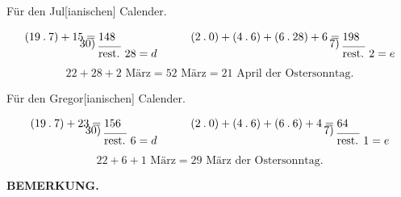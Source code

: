 \begin{center}Für den Jul[ianischen] Calender.\end{center}
\[
\begin{array}{r@{\;}l}
(19\mathbin{.}7)+15=&148\\[-6pt]30)&\rule{2em}{.35pt}\\[-3pt]&\text{rest. }28=d
\end{array}
\qquad
\begin{array}{r@{\;}l}
(2\mathbin{.}0)+(4\mathbin{.}6)+(6\mathbin{.}28)+6=&198\\[-6pt]7)&\rule{2em}{.35pt}\\[-3pt]&\text{rest. }2=e
\end{array}
\]
\[
22+28+2\text{ März}=52\text{ März}=21\text{ April der Ostersonntag.}
\]
\clearpage{}
\begin{center}Für den Gregor[ianischen] Calender.\end{center}
\[
\begin{array}{r@{\;}l}
(19\mathbin{.}7)+23=&156\\[-6pt]30)&\rule{2em}{.35pt}\\[-3pt]&\text{rest. }6=d
\end{array}
\qquad
\begin{array}{r@{\;}l}
(2\mathbin{.}0)+(4\mathbin{.}6)+(6\mathbin{.}6)+4=&64\\[-6pt]7)&\rule{2em}{.35pt}\\[-3pt]&\text{rest. }1=e
\end{array}
\]
\[
22+6+1\text{ März}=29\text{ März der Ostersonntag.}
\]
\begin{center}\textbf{BEMERKUNG.}\end{center}
\begingroup\small
